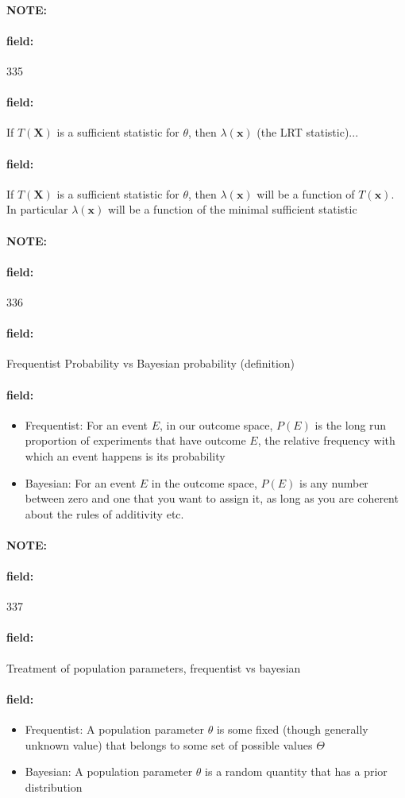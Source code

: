 \documentclass[12pt]{article}
\newenvironment{note}{\paragraph{NOTE:}}{}
\newenvironment{field}{\paragraph{field:}}{}
\begin{document}
\begin{note}
    \begin{field}
        \tiny 335
    \end{field}
    \begin{field}
        If $T(\mathbf{X})$ is a sufficient statistic for $\theta$, then $\lambda(\mathbf{x})$ (the LRT statistic)...
    \end{field}
    \begin{field}
        If $T(\mathbf{X})$ is a sufficient statistic for $\theta$, then $\lambda(\mathbf{x})$ will be a function of $T(\mathbf{x})$. In particular $\lambda(\mathbf{x})$ will be a function of the minimal sufficient statistic
    \end{field}
\end{note}


\begin{note}
    \begin{field}
        \tiny 336
    \end{field}
    \begin{field}
        Frequentist Probability vs Bayesian probability  (definition)
    \end{field}
    \begin{field}
      \begin{itemize}
        \item Frequentist: For an event $E$, in our outcome space, $P(E)$ is the long run proportion of experiments that have outcome $E$, the relative frequency with which an event happens is its probability
        \item Bayesian: For an event $E$ in the outcome space, $P(E)$ is any number between zero and one that you want to assign it, as long as you are coherent about the rules of additivity etc.
      \end{itemize}
    \end{field}
\end{note}

\begin{note}
    \begin{field}
        \tiny 337
    \end{field}
    \begin{field}
        Treatment of population parameters, frequentist vs bayesian
    \end{field}
    \begin{field}
        \begin{itemize}
          \item Frequentist: A population parameter $\theta$ is some fixed (though generally unknown value) that belongs to some set of possible values $\Theta$
          \item Bayesian: A population parameter $\theta$ is a random quantity that has a prior distribution
        \end{itemize}
    \end{field}
\end{note}
\end{document}

